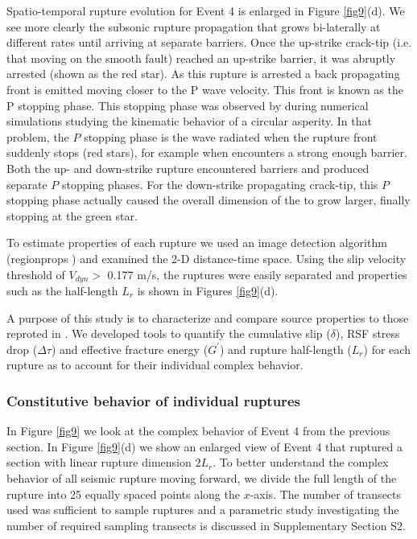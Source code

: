 \documentclass[preprint,1p, 10pt,authoryear]{elsarticle}
\begin{document}
Spatio-temporal rupture evolution for Event 4 is enlarged in Figure \ref{fig9}(d).  We see more clearly the subsonic rupture propagation that grows bi-laterally at different rates until arriving at separate barriers. Once the up-strike crack-tip (i.e. that moving on the smooth fault) reached an up-strike barrier, it was abruptly arrested (shown as the red star).  As this rupture is arrested a back propagating front is emitted moving closer to the P wave velocity.  This front is known as the P stopping phase.  This stopping phase was observed by \citet{Madariaga1976} during numerical simulations studying the kinematic behavior of a circular asperity.  In that problem, the $P$ stopping phase is the wave radiated when the rupture front suddenly stops (red stars), for example when encounters a strong enough barrier.  Both the up- and down-strike rupture encountered barriers and produced separate $P$ stopping phases.  For the down-strike propagating crack-tip, this $P$ stopping phase actually caused the overall dimension of the to grow larger, finally stopping at the green star. 

To estimate properties of each rupture we used an image detection algorithm (regionprops \citep{Matlab}) and examined the 2-D distance-time space. Using the slip velocity threshold of $V_{dyn}>$ 0.177 m/s, the ruptures were easily separated and properties such as the half-length $L_{r}$ is shown in Figures \ref{fig9}(d).

A purpose of this study is to characterize and compare source properties to those reproted in \citet{Selvadurai2019}. We developed tools to quantify the cumulative slip ($\delta$), RSF stress drop ($\Delta \tau$) and effective fracture energy ($G^{'}$) and rupture half-length ($L_{r}$) for each rupture as to account for their individual complex behavior.

\subsubsection{Constitutive behavior of individual ruptures }
\label{Constitutive}
In Figure \ref{fig9} we look at the complex behavior of Event 4 from the previous section.  In Figure \ref{fig9}(d) we show an enlarged view of Event 4 that ruptured a section with linear rupture dimension $2L_{r}$.  To better understand the complex behavior of all seismic rupture moving forward, we divide the full length of the rupture into 25 equally spaced points along the $x$-axis. The number of transects used was sufficient to sample ruptures and a parametric study investigating the number of required sampling transects is discussed in Supplementary Section S2.   
\end{document}
